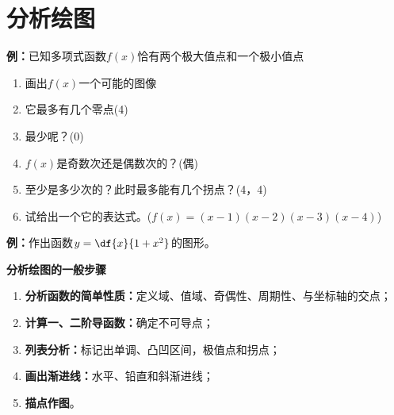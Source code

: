 \section{分析绘图}

{\bf 例：}已知多项式函数$f(x)$恰有两个极大值点和一个极小值点
\begin{enumerate}[(1)]
  \setlength{\itemindent}{1cm}
  \item 画出$f(x)$一个可能的图像
  \item 它最多有几个零点\hfill(4)
  \item 最少呢？\hfill(0)
  \item $f(x)$是奇数次还是偶数次的？\hfill(偶)
  \item 至少是多少次的？此时最多能有几个拐点？\hfill(4，4)
  \item 试给出一个它的表达式。\hfill($f(x)=(x-1)(x-2)(x-3)(x-4)$)
\end{enumerate}


{\bf 例：}作出函数$y=\df{x}{1+x^2}$的图形。

\begin{center}
\end{center}

\begin{thx}
	{\bf 分析绘图的一般步骤}
	\begin{enumerate}[(1)]
	  \item {\bf 分析函数的简单性质：}定义域、值域、奇偶性、周期性、与坐标轴的交点；
	  \item {\bf 计算一、二阶导函数：}确定不可导点；
	  \item {\bf 列表分析：}标记出单调、凸凹区间，极值点和拐点；
	  \item {\bf 画出渐进线：}水平、铅直和斜渐进线；
	  \item {\bf 描点作图}。
	\end{enumerate}
\end{thx}

